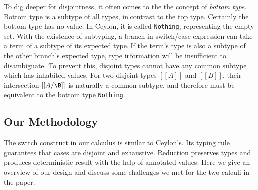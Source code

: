 To dig deeper for disjointness, it often comes to the the concept
of \emph{bottom type}.
Bottom type is a subtype of all types, in contrast to the top type.
Certainly the bottom type has no value.
In Ceylon, it is called \lstinline{Nothing}, representing the empty set.
%
With the existence of subtyping, a branch in switch/case expression
can take a term of a subtype of its expected type.
If the term's type is also a subtype of the other branch's expected
type, type information will be insufficient to disambiguate.
To prevent this, disjoint types cannot have any common subtype which has
inhabited values.
For two disjoint types $[[A]]$ and $[[B]]$, their intersection $[[A/\B]]$
is naturally a common subtype, and therefore must be equivalent to
the bottom type \lstinline{Nothing}.

\begin{comment}
Let us call them \emph{bottom-like types}.
In a switch construct, every case has a type annotation.
In Ceylon, this type annotation is not allowed to be bottom-like.
The compiler uses this type to narrow the static type of the input term
in switch/case, and rejects the program if the resultant type is equivalent
to \lstinline{Nothing}.
\end{comment}


\subsection{Our Methodology}

The switch construct in our calculus \cal is similar to Ceylon's.
Its typing rule guarantees that cases are disjoint and exhaustive.
Reduction preserves types and produces deterministic result with
the help of annotated values.
Here we give an overview of our design and discuss some challenges
we met for the two calculi in the paper.


